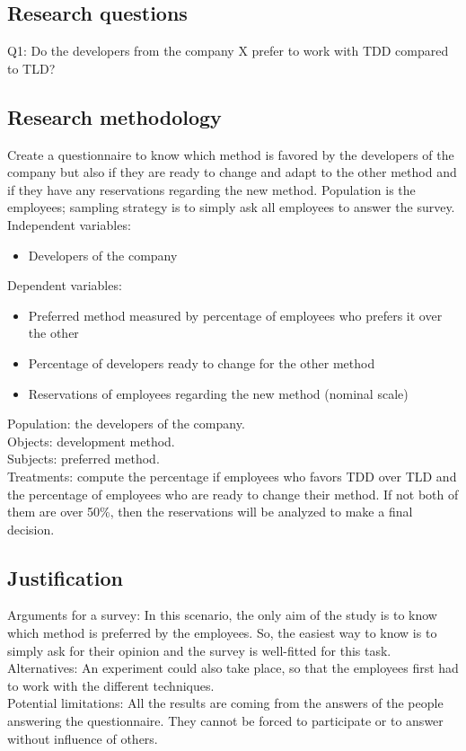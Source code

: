 \documentclass{article}
\begin{document}
\subsection{Research questions}
Q1: Do the developers from the company X prefer to work with TDD compared to TLD?

\subsection{Research methodology}
Create a questionnaire to know which method is favored by the developers of the company but also if they are ready to change and adapt to the other method and if they have any reservations regarding the new method.
Population is the employees; sampling strategy is to simply ask all employees to answer the survey. \\
Independent variables:
\begin{itemize}
    \item Developers of the company
\end{itemize}
Dependent variables:
\begin{itemize}
    \item Preferred method measured by percentage of employees who prefers it over the other
    \item Percentage of developers ready to change for the other method
    \item Reservations of employees regarding the new method (nominal scale)
\end{itemize}
Population: the developers of the company. \\
Objects: development method. \\
Subjects:  preferred method. \\
Treatments: compute the percentage if employees who favors TDD over TLD and the percentage of employees who are ready to change their method. If not both of them are over 50\%, then the reservations will be analyzed to make a final decision.

\subsection{Justification}
Arguments for a survey: In this scenario, the only aim of the study is to know which method is preferred by the employees. So, the easiest way to know is to simply ask for their opinion and the survey is well-fitted for this task. \\
Alternatives: An experiment could also take place, so that the employees first had to work with the different techniques. \\
Potential limitations: All the results are coming from the answers of the people answering the questionnaire. They cannot be forced to participate or to answer without influence of others. 
\end{document}
